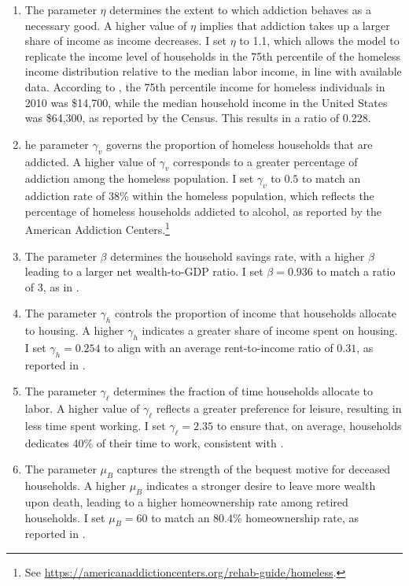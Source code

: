 \documentclass[parskip=full]{article}
\begin{document}
\begin{enumerate}
    \item The parameter $\eta$ determines the extent to which addiction behaves as a necessary good. A higher value of $\eta$ implies that addiction takes up a larger share of income as income decreases. I set $\eta$ to 1.1, which allows the model to replicate the income level of households in the 75th percentile of the homeless income distribution relative to the median labor income, in line with available data. According to \citet{meyeretal-2024}, the 75th percentile income for homeless individuals in 2010 was \$14,700, while the median household income in the United States was \$64,300, as reported by the Census. This results in a ratio of 0.228.
    \item he parameter $\gamma_{v}$ governs the proportion of homeless households that are addicted. A higher value of $\gamma_{v}$ corresponds to a greater percentage of addiction among the homeless population. I set $\gamma_{v}$ to $0.5$ to match an addiction rate of 38\% within the homeless population, which reflects the percentage of homeless households addicted to alcohol, as reported by the American Addiction Centers.\footnote{See \url{https://americanaddictioncenters.org/rehab-guide/homeless}.}
    \item The parameter $\beta$ determines the household savings rate, with a higher $\beta$ leading to a larger net wealth-to-GDP ratio. I set $\beta = 0.936$ to match a ratio of 3, as in \citet{gkkoc}.
    \item The parameter $\gamma_{h}$ controls the proportion of income that households allocate to housing. A higher $\gamma_{h}$ indicates a greater share of income spent on housing. I set $\gamma_{h} = 0.254$ to align with an average rent-to-income ratio of $0.31$, as reported in \citet{rs-2023}.
    \item The parameter $\gamma_{\ell}$ determines the fraction of time households allocate to labor. A higher value of $\gamma_{\ell}$ reflects a greater preference for leisure, resulting in less time spent working. I set $\gamma_{\ell} = 2.35$ to ensure that, on average, households dedicates 40\% of their time to work, consistent with \citet{gkkoc}.
    \item The parameter $\mu_{B}$ captures the strength of the bequest motive for deceased households. A higher $\mu_{B}$ indicates a stronger desire to leave more wealth upon death, leading to a higher homeownership rate among retired households. I set $\mu_{B} = 60$ to match an 80.4\% homeownership rate, as reported in \citet{rs-2023}.

\end{enumerate}
\end{document}
